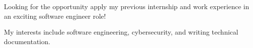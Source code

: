

\begin{cvparagraph}
Looking for the opportunity apply my previous internship and work experience in an exciting software engineer role!

My interests include software engineering, cybersecurity, and writing technical documentation.
\end{cvparagraph}
